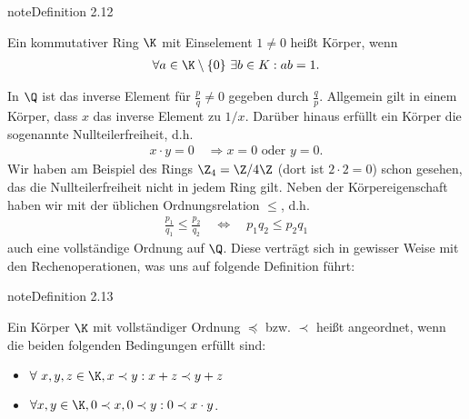 \documentclass[letterpaper,10pt,english]{jupyterBook}
\begin{document}
\label{grundlagen/zahlensysteme:definition-9}
\begin{sphinxadmonition}{note}{Definition 2.12}



Ein kommutativer Ring \(\K\) mit Einselement \(1 \neq 0\) heißt Körper, wenn
\begin{equation*}
\begin{split} \forall a \in\K \setminus \{0\} ~\exists b \in K:  a b = 1.\end{split}
\end{equation*}\end{sphinxadmonition}

In \(\Q\) ist das inverse Element für \(\frac{p}q \neq 0\) gegeben durch \(\frac{q}p\). Allgemein gilt in einem Körper, dass \(x\) das inverse Element zu \(1/x\). Darüber hinaus erfüllt ein Körper die sogenannte Nullteilerfreiheit, d.h.
\begin{equation*}
\begin{split}x \cdot y = 0 \quad \Rightarrow x = 0 \text{ oder } y =0.\end{split}
\end{equation*}
Wir haben am Beispiel des Rings \(\Z_4=\Z/4\Z\) (dort ist \(2 \cdot 2 = 0\)) schon gesehen, das die Nullteilerfreiheit nicht in jedem Ring gilt.
Neben der Körpereigenschaft haben wir mit der üblichen Ordnungsrelation \(\leq\), d.h.
\begin{equation*}
\begin{split}\frac{p_1}{q_1} \leq \frac{p_2}{q_2} \quad \Leftrightarrow \quad p_1 q_2 \leq p_2 q_1\end{split}
\end{equation*}
auch eine vollständige Ordnung auf \(\Q\). Diese verträgt sich in gewisser Weise mit den Rechenoperationen, was uns auf folgende Definition führt:
\label{grundlagen/zahlensysteme:definition-10}
\begin{sphinxadmonition}{note}{Definition 2.13}



Ein Körper \(\K\) mit vollständiger Ordnung \(\preceq\) bzw. \(\prec\)  heißt angeordnet, wenn die beiden folgenden Bedingungen erfüllt sind:
\begin{itemize}
\item {} 
\(\forall~x,y,z \in \K, x \prec y: x+z \prec y+z\)

\item {} 
\(\forall x,y \in \K, 0 \prec x, 0 \prec y: 0 \prec x \cdot y\).

\end{itemize}
\end{sphinxadmonition}
\end{document}
